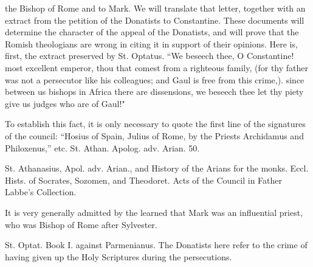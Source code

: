 the Bishop of Rome and to Mark. We will translate that letter, together with an extract from the petition of the Donatists to Constantine. These documents will determine the character of the appeal of the Donatists, and will prove that the Romish theologians are wrong in citing it in support of their opinions. Here is, first, the extract preserved by St. Optatus. “We beseech thee, O Constantine! most excellent emperor, thou that comest from a righteous family, (for thy father was not a persecutor like his colleagues; and Gaul is free from this crime,). since between us bishops in Africa there are dissensions, we beseech thee let thy piety give us judges who are of Gaul!"

To establish this fact, it is only necessary to quote the first line of the signatures of the council: “Hosius of Spain, Julius of Rome, by the Priests Archidamus and Philoxenus,” etc. St. Athan. Apolog. adv. Arian. 50.

St. Athanasius, Apol. adv. Arian., and History of the Arians for the monks. Eccl. Hists. of Socrates, Sozomen, and Theodoret. Acts of the Council in Father Labbe’s Collection.

It is very generally admitted by the learned that Mark was an influential priest, who was Bishop of Rome after Sylvester.

St. Optat. Book I. against Parmenianus. The Donatists here refer to the crime of having given up the Holy Scriptures during the persecutions.

